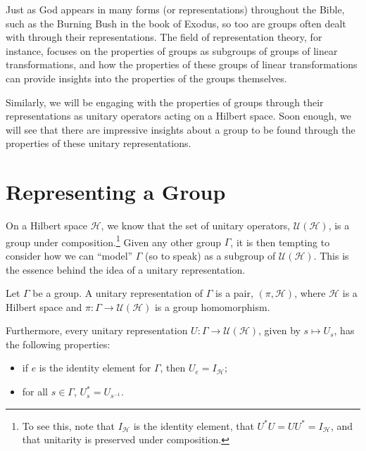 Just as God appears in many forms (or representations) throughout the Bible, such as the Burning Bush in the book of Exodus, so too are groups often dealt with through their representations. The field of representation theory, for instance, focuses on the properties of groups as subgroups of groups of linear transformations, and how the properties of these groups of linear transformations can provide insights into the properties of the groups themselves.\newline

Similarly, we will be engaging with the properties of groups through their representations as unitary operators acting on a Hilbert space. Soon enough, we will see that there are impressive insights about a group to be found through the properties of these unitary representations.
\section{Representing a Group}%
On a Hilbert space $\mathcal{H}$, we know that the set of unitary operators, $\mathcal{U}\left(\mathcal{H}\right)$, is a group under composition.\footnote{To see this, note that $I_{\mathcal{H}}$ is the identity element, that $U^{\ast}U =UU^{\ast} = I_{\mathcal{H}}$, and that unitarity is preserved under composition.} Given any other group $\Gamma$, it is then tempting to consider how we can ``model'' $\Gamma$ (so to speak) as a subgroup of $\mathcal{U}\left(\mathcal{H}\right)$. This is the essence behind the idea of a unitary representation.
\begin{definition}
  Let $\Gamma$ be a group. A unitary representation of $\Gamma$ is a pair, $\left(\pi,\mathcal{H}\right)$, where $\mathcal{H}$ is a Hilbert space and $\pi\colon \Gamma\rightarrow \mathcal{U}\left(\mathcal{H}\right)$ is a group homomorphism.\newline

  Furthermore, every unitary representation $U\colon \Gamma\rightarrow \mathcal{U}\left(\mathcal{H}\right)$, given by $s\mapsto U_s$, has the following properties:
  \begin{itemize}
    \item if $e$ is the identity element for $\Gamma$, then $U_{e} = I_{\mathcal{H}}$;
    \item for all $s\in \Gamma$, $U_{s}^{\ast} = U_{s^{-1}}$.
  \end{itemize}
\end{definition}
